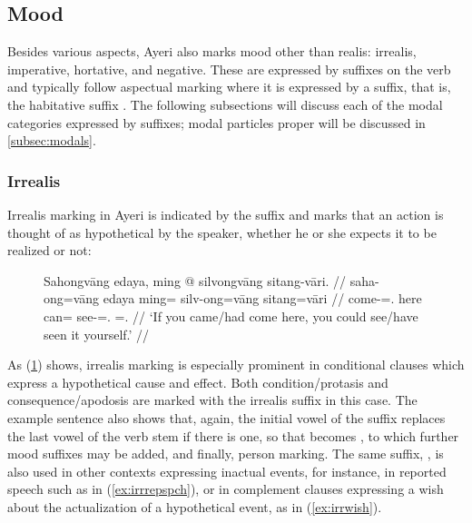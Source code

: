 
\subsection{Mood}
\label{subsec:mood}

Besides various aspects, Ayeri also marks mood other than realis: irrealis,
imperative, hortative, and negative. These are expressed by suffixes on
the verb and typically follow aspectual marking where it is expressed by a
suffix, that is, the habitative suffix . The following
subsections will discuss each of the modal categories expressed by suffixes;
modal particles proper will be discussed in \autoref{subsec:modals}.

\subsubsection{Irrealis}

Irrealis marking in Ayeri is indicated by the suffix  and 
marks that an action is thought of as hypothetical by the speaker, whether he 
or she expects it to be realized or not:

\begin{figure}[h]
\ex\label{ex:irrealis}\begingl
	\gla Sahongvāng edaya, ming @ silvongvāng sitang-vāri. //
	\glb saha-ong=vāng edaya ming= silv-ong=vāng sitang=vāri //
	\glb come-\Irr{}=\Second{}.\Aarg{} here can= see-\Irr{}=\Second{}.\Aarg{} 
		\Refl{}=\Second{}.\Ins{} //
	\glft `If you came/had come here, you could see/have seen it 
		yourself.' //
\endgl\xe
\end{figure}

As (\ref{ex:irrealis}) shows, irrealis marking is especially prominent in
conditional clauses which express a hypothetical cause and effect. Both
condition/protasis and consequence/apodosis are marked with the irrealis suffix
in this case. The example sentence also shows that, again, the initial vowel of
the suffix replaces the last vowel of the verb stem if there is one, so that
 becomes , to which further mood
suffixes may be added, and finally, person marking. The same suffix,
, is also used in other contexts expressing inactual events,
for instance, in reported speech such as in (\ref{ex:irrrepspch}), or in
complement clauses expressing a wish about the actualization of a hypothetical
event, as in (\ref{ex:irrwish}).

